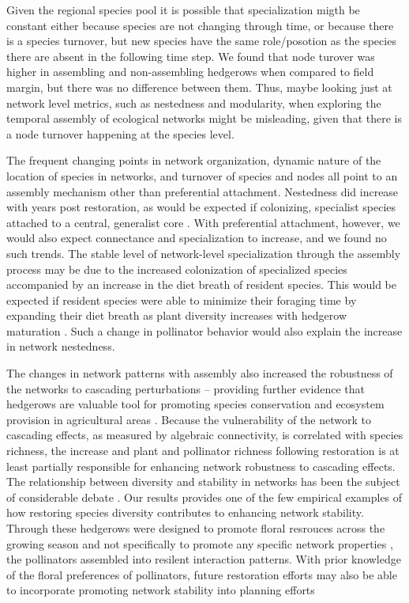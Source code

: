 \documentclass[12pt]{article}
\begin{document}
Given the regional species pool it is possible that specialization migth be constant either because species are not changing through time, or because there is a species turnover, but new species have the same role/posotion as the species there are absent in the following time step. We found that node turover was higher in assembling and non-assembling hedgerows when compared to field margin, but there was no difference between them. Thus, maybe looking just at network level metrics, such as nestedness and modularity, when exploring the temporal assembly of ecological networks might be misleading, given that there is a node turnover happening at the species level. 

The frequent changing points in network organization, dynamic nature
of the location of species in networks, and turnover of species and
nodes all point to an assembly mechanism other than preferential
attachment. Nestedness did increase with years post restoration, as
would be expected if colonizing, specialist species attached to a
central, generalist core \cite{albrecht2010plant}. With preferential
attachment, however, we would also expect connectance and
specialization to increase, and we found no such trends. The stable
level of network-level specialization through the assembly process may
be due to the increased colonization of specialized species
\citep{mgonigle-2015-x} accompanied by an increase in the diet breath
of resident species. This would be expected if resident species were
able to minimize their foraging time by expanding their diet breath as
plant diversity increases with hedgerow maturation \citep{Waser1996,
  pyke1984optimal, Bluthgen2007, albrecht2010plant}. Such a change in
pollinator behavior would also explain the increase in network
nestedness.

The changes in network patterns with assembly also increased the
robustness of the networks to cascading perturbations -- providing
further evidence that hedgerows are valuable tool for promoting
species conservation and ecosystem provision in agricultural areas
\citep{mgonigle-2015-x, ponisio2015farm, kremen-2015-602}. Because the
vulnerability of the network to cascading effects, as measured by
algebraic connectivity, is correlated with species richness, the
increase and plant and pollinator richness following restoration is at
least partially responsible for enhancing network robustness to
cascading effects. The relationship between diversity and stability in
networks has been the subject of considerable debate
\citep[e.g.,][]{may1972will, pimm1984complexity,
  montoya2006ecological}. Our results provides one of the few
empirical examples of how restoring species diversity contributes to
enhancing network stability. Through these hedgerows were designed to
promote floral resrouces across the growing season and not
specifically to promote any specific network properties
\citep{menz-2010-4}, the pollinators assembled into resilent
interaction patterns. With prior knowledge of the floral preferences
of pollinators, future restoration efforts may also be able to
incorporate promoting network stability into planning efforts
\citep{mgonigle2016tool}
 
\end{document}
